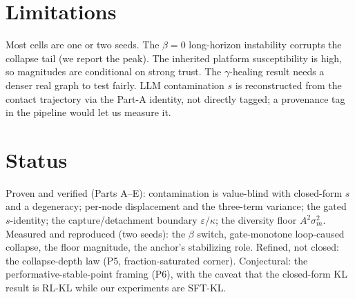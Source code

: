 \documentclass[11pt]{article}
\begin{document}
\section{Limitations}
Most cells are one or two seeds. The $\beta=0$ long-horizon instability corrupts the
collapse tail (we report the peak). The inherited platform susceptibility is high, so
magnitudes are conditional on strong trust. The $\gamma$-healing result needs a denser
real graph to test fairly. LLM contamination $s$ is reconstructed from the contact
trajectory via the Part-A identity, not directly tagged; a provenance tag in the pipeline
would let us measure it.

\section{Status}
Proven and verified (Parts A--E): contamination is value-blind with closed-form $s$ and a
degeneracy; per-node displacement and the three-term variance; the gated $s$-identity;
the capture/detachment boundary $\varepsilon/\kappa$; the diversity floor $A^2\sigma_m^2$.
Measured and reproduced (two seeds): the $\beta$ switch, gate-monotone loop-caused
collapse, the floor magnitude, the anchor's stabilizing role. Refined, not closed: the
collapse-depth law (P5, fraction-saturated corner). Conjectural: the
performative-stable-point framing (P6), with the caveat that the closed-form KL result is
RL-KL while our experiments are SFT-KL.
\end{document}
